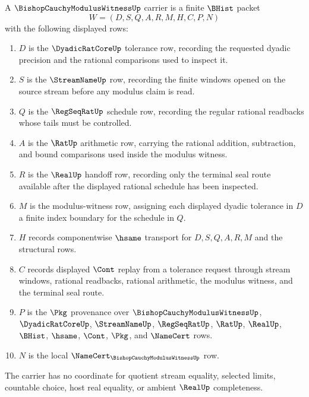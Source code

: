 \begin{definition}
\label{def:bishop-cauchy-modulus-witness-carrier}
A $\BishopCauchyModulusWitnessUp$ carrier is a finite $\BHist$ packet
$$
W=(D,S,Q,A,R,M,H,C,P,N)
$$
with the following displayed rows:
\begin{enumerate}
\item $D$ is the $\DyadicRatCoreUp$ tolerance row, recording the requested dyadic precision and the rational comparisons used to inspect it.
\item $S$ is the $\StreamNameUp$ row, recording the finite windows opened on the source stream before any modulus claim is read.
\item $Q$ is the $\RegSeqRatUp$ schedule row, recording the regular rational readbacks whose tails must be controlled.
\item $A$ is the $\RatUp$ arithmetic row, carrying the rational addition, subtraction, and bound comparisons used inside the modulus witness.
\item $R$ is the $\RealUp$ handoff row, recording only the terminal seal route available after the displayed rational schedule has been inspected.
\item $M$ is the modulus-witness row, assigning each displayed dyadic tolerance in $D$ a finite index boundary for the schedule in $Q$.
\item $H$ records componentwise $\hsame$ transport for $D,S,Q,A,R,M$ and the structural rows.
\item $C$ records displayed $\Cont$ replay from a tolerance request through stream windows, rational readbacks, rational arithmetic, the modulus witness, and the terminal seal route.
\item $P$ is the $\Pkg$ provenance over $\BishopCauchyModulusWitnessUp$, $\DyadicRatCoreUp$, $\StreamNameUp$, $\RegSeqRatUp$, $\RatUp$, $\RealUp$, $\BHist$, $\hsame$, $\Cont$, $\Pkg$, and $\NameCert$ rows.
\item $N$ is the local $\NameCert_{\BishopCauchyModulusWitnessUp}$ row.
\end{enumerate}
The carrier has no coordinate for quotient stream equality, selected limits, countable choice, host real equality, or ambient $\RealUp$ completeness.
\end{definition}


